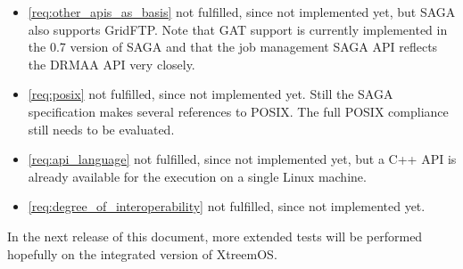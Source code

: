 \begin{itemize}
\item \ref{req:other_apis_as_basis} not fulfilled, since not
      implemented yet, but SAGA also supports GridFTP. Note that GAT support
      is currently  implemented in the 0.7 version of SAGA and that
      the job management SAGA API reflects the DRMAA API very closely.
\item \ref{req:posix} not fulfilled, since not
      implemented yet. Still the SAGA specification makes several
      references to POSIX. The full POSIX compliance still needs to be evaluated.
\item \ref{req:api_language} not fulfilled, since not
      implemented yet, but a C++ API is already available for the execution on a single Linux machine.
\item \ref{req:degree_of_interoperability} not fulfilled, since not
      implemented yet.
\end{itemize}


In the next release of this document, more extended tests will be
performed hopefully on the integrated version of XtreemOS.

